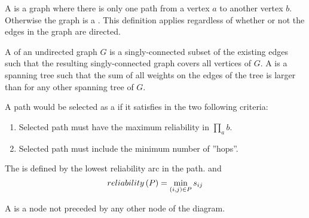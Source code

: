 \begin{defi}
A  is a graph where there is only one path from a vertex $a$ to another vertex $b$. Otherwise the graph is a . This definition applies regardless of whether or not the edges in the graph are directed.
\cite{Barber2011}
\end{defi}

\begin{defi}
A  of an undirected graph $G$ is a singly-connected subset of the existing edges such that the resulting singly-connected graph covers all vertices of $G$. A  is a spanning tree such that the sum of all weights on the edges of the tree is larger than for any other spanning tree of $G$.
\cite{Barber2011}
\end{defi}

\begin{defi}
A path would be selected as a  if it satisfies in the two following criteria:
\begin{enumerate}
\item Selected path must have the maximum reliability in $\prod_ab$.
\item Selected path must include the minimum number of ''hops''.
\end{enumerate}
\cite{}
\end{defi}

\begin{defi}
The  is defined by the lowest reliability arc in the path. and
\begin{equation}
reliability\left(P\right)=\displaystyle\min_{\left( i,j\right)\in P} s_{ij}
\end{equation}
\cite{}
\end{defi}

\begin{defi}
A  is a node not preceded by any other node of the diagram.
\cite{conf/fedcsis/Kulikowski12}
\end{defi}
